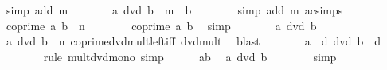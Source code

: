 \begin{isabellebody}
\ {\isacharparenleft}{\kern0pt}simp\ add{\isacharcolon}{\kern0pt}\ m{\isacharparenright}{\kern0pt}\isanewline
\ \ \ \ \isamarkupfalse%
\ \isamarkupfalse%
\ {\isachardoublequoteopen}a{\isacharprime}{\kern0pt}\ dvd\ b{\isacharprime}{\kern0pt}\ {\isacharcircum}{\kern0pt}\ m\ {\isacharasterisk}{\kern0pt}\ b{\isacharprime}{\kern0pt}{\isachardoublequoteclose}\isanewline
\ \ \ \ \ \ \isamarkupfalse%
\ {\isacharparenleft}{\kern0pt}simp\ add{\isacharcolon}{\kern0pt}\ m\ ac{\isacharunderscore}{\kern0pt}simps{\isacharparenright}{\kern0pt}\isanewline
\ \ \ \ \isamarkupfalse%
\ \isamarkupfalse%
\ {\isachardoublequoteopen}coprime\ a{\isacharprime}{\kern0pt}\ {\isacharparenleft}{\kern0pt}b{\isacharprime}{\kern0pt}\ {\isacharcircum}{\kern0pt}\ n{\isacharparenright}{\kern0pt}{\isachardoublequoteclose}\isanewline
\ \ \ \ \ \ \isamarkupfalse%
\ {\isacartoucheopen}coprime\ a{\isacharprime}{\kern0pt}\ b{\isacharprime}{\kern0pt}{\isacartoucheclose}\ \isamarkupfalse%
\ simp\isanewline
\ \ \ \ \isamarkupfalse%
\ \isamarkupfalse%
\ {\isachardoublequoteopen}a{\isacharprime}{\kern0pt}\ dvd\ b{\isacharprime}{\kern0pt}{\isachardoublequoteclose}\isanewline
\ \ \ \ \ \ \isamarkupfalse%
\ {\isacartoucheopen}a{\isacharprime}{\kern0pt}\ dvd\ b{\isacharprime}{\kern0pt}\ {\isacharcircum}{\kern0pt}\ n{\isacartoucheclose}\ coprime{\isacharunderscore}{\kern0pt}dvd{\isacharunderscore}{\kern0pt}mult{\isacharunderscore}{\kern0pt}left{\isacharunderscore}{\kern0pt}iff\ dvd{\isacharunderscore}{\kern0pt}mult\ \isamarkupfalse%
\ blast\isanewline
\ \ \ \ \isamarkupfalse%
\ \isamarkupfalse%
\ {\isachardoublequoteopen}a{\isacharprime}{\kern0pt}\ {\isacharasterisk}{\kern0pt}\ {\isacharquery}{\kern0pt}d\ dvd\ b{\isacharprime}{\kern0pt}\ {\isacharasterisk}{\kern0pt}\ {\isacharquery}{\kern0pt}d{\isachardoublequoteclose}\isanewline
\ \ \ \ \ \ \isamarkupfalse%
\ {\isacharparenleft}{\kern0pt}rule\ mult{\isacharunderscore}{\kern0pt}dvd{\isacharunderscore}{\kern0pt}mono{\isacharparenright}{\kern0pt}\ simp\isanewline
\ \ \ \ \isamarkupfalse%
\ ab{\isacharprime}{\kern0pt}{\isacharparenleft}{\kern0pt}{}{\isacharcomma}{\kern0pt}{}{\isacharparenright}{\kern0pt}\ \isamarkupfalse%
\ {\isachardoublequoteopen}a\ dvd\ b{\isachardoublequoteclose}\isanewline
\ \ \ \ \ \ \isamarkupfalse%
\ simp\isanewline
\ \ \isamarkupfalse%

\end{isabellebody}
